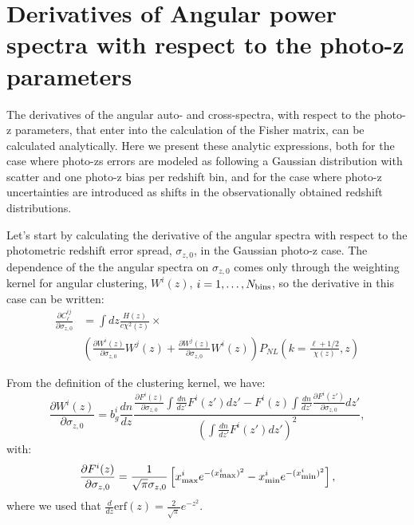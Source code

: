 \documentclass[a4paper,fleqn,usenatbib]{mnras}
\begin{document}


\section{Derivatives of Angular power spectra with respect to the photo-z parameters}

The derivatives of the angular auto- and cross-spectra, with respect to the photo-z parameters, that enter into the calculation of the Fisher matrix, can be calculated analytically. 
Here we present these analytic expressions, both for the case where photo-zs errors are modeled as following a Gaussian distribution with scatter and one photo-z bias per redshift bin, and for the case where photo-z uncertainties are introduced as shifts in the observationally obtained redshift distributions.

Let's start by calculating the derivative of the angular spectra with respect to the photometric redshift error spread, $\sigma_{z,0}$, in the Gaussian photo-z case. The dependence of the the angular spectra on $\sigma_{z,0}$ comes only through the weighting kernel for angular clustering, $W^i(z)$, $i = 1, \dots,  N_{\mbox{\scriptsize{bins}}}$, so the derivative in this case can be written:
\begin{align}
\frac{\partial C_\ell^{ij}}{\partial \sigma_{z,0}}  &=  \int  dz \frac{H(z)}{c\chi^2(z)} \times \nonumber \\   
 & \left(\frac{\partial W^i(z)}{\partial \sigma_{z,0}} W^j(z) +
 \frac{\partial W^j(z)}{\partial \sigma_{z,0}} W^i(z)  \right)P_{NL}\left(k=\frac{\ell+1/2}{\chi(z)},z \right) 
\end{align}

From the definition of the clustering kernel, we have:
\begin{equation}
\frac{\partial W^i(z)}{\partial \sigma_{z,0}} =b_g^i \frac{dn}{dz}\frac{\frac{\partial F^i(z)}{\partial \sigma_{z,0}}\int \frac{dn}{dz'}F^i(z')dz' -F^i(z)\int \frac{dn}{dz'} \frac{\partial F^i(z')}{\partial \sigma_{z,0} }dz'}{\left(\int \frac{dn}{dz'}F^i(z')dz' \right)^2},
\end{equation}
with:
\begin{equation}
\frac{\partial  F^i(z)}{\partial \sigma_{z,0}} = \frac{1}{\sqrt{\pi}\sigma_{z,0}}\left[ x_{\mbox{\scriptsize{max}}}^i e^{- (x_{\mbox{\scriptsize{max}}}^i)^2}  -  x_{\mbox{\scriptsize{min}}}^i e^{- (x_{\mbox{\scriptsize{min}}}^i)^2} \right],
\end{equation}
where we used that $\frac{d}{dz} \mbox{erf}(z) =  \frac{2}{\sqrt{\pi}} e^{-z^2}$.
\end{document}

